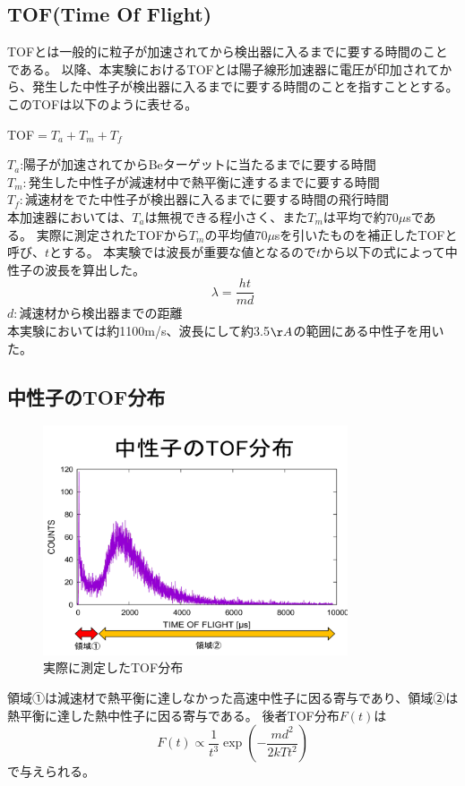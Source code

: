 \subsection {TOF(Time Of Flight)}
TOFとは一般的に粒子が加速されてから検出器に入るまでに要する時間のことである。
以降、本実験におけるTOFとは陽子線形加速器に電圧が印加されてから、発生した中性子が検出器に入るまでに要する時間のことを指すこととする。
このTOFは以下のように表せる。
\begin{center}TOF$=T_a+T_m+T_f$\end{center}
$T_a$:陽子が加速されてからBeターゲットに当たるまでに要する時間\\
$T_m:発生した中性子が減速材中で熱平衡に達するまでに要する時間$\\
$T_f:減速材をでた中性子が検出器に入るまでに要する時間の飛行時間$\\
本加速器においては、$T_a$は無視できる程小さく、また$T_m$は平均で約70$\mu$sである。
実際に測定されたTOFから$T_m$の平均値70$\mu$sを引いたものを補正したTOFと呼び、$t$とする。
本実験では波長が重要な値となるので$t$から以下の式によって中性子の波長を算出した。
\begin{equation}
{\lambda}={\frac{ht}{md}}
\end{equation}
$d:減速材から検出器までの距離$\\
本実験においては約1100m/s、波長にして約3.5$\AA$の範囲にある中性子を用いた。
\subsection {中性子のTOF分布}
\begin{figure}[h]
\centering
\includegraphics[width=9cm]{accelerator/TOF1.pdf}
\caption{実際に測定したTOF分布}
\end{figure}
領域①は減速材で熱平衡に達しなかった高速中性子に因る寄与であり、領域②は熱平衡に達した熱中性子に因る寄与である。
後者TOF分布$F(t)$は\begin{equation}F(t)\propto \frac{1}{t^{3}}\exp(-\frac{md^2}{2kTt^2}) \end{equation}で与えられる。

